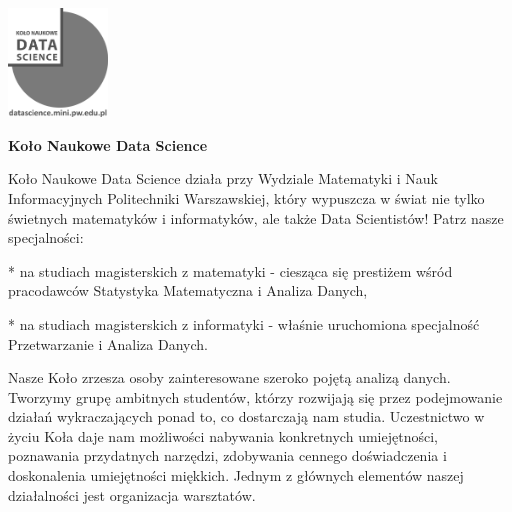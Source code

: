\documentclass[\main/boa.tex]{subfiles}
\begin{document}
	\begin{minipage}[t]{0.915\textwidth}
		\center     
		\includegraphics[width=100px]{img/logos.bw/knds_logo.png} 
	\end{minipage}

\Large \textbf {Koło Naukowe Data Science}


\vskip 0.3cm
\normalsize 
Koło Naukowe Data Science działa przy Wydziale Matematyki i Nauk Informacyjnych Politechniki Warszawskiej, który wypuszcza w świat nie tylko świetnych matematyków i informatyków, ale także Data Scientistów! Patrz nasze specjalności:

* na studiach magisterskich z matematyki - ciesząca się prestiżem wśród pracodawców Statystyka Matematyczna i Analiza Danych,

*    na studiach magisterskich z informatyki - właśnie uruchomiona specjalność Przetwarzanie i Analiza Danych.

Nasze Koło zrzesza osoby zainteresowane szeroko pojętą analizą danych. Tworzymy grupę ambitnych studentów, którzy rozwijają się przez podejmowanie działań wykraczających ponad to, co dostarczają nam studia. Uczestnictwo w życiu Koła daje nam możliwości nabywania konkretnych umiejętności, poznawania przydatnych narzędzi, zdobywania cennego doświadczenia i doskonalenia umiejętności miękkich. Jednym z głównych elementów naszej działalności jest organizacja warsztatów. 
\end{document}
